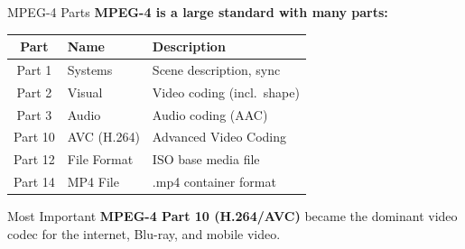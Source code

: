 \documentclass[aspectratio=169,12pt]{beamer}
\begin{document}
\begin{frame}{MPEG-4 Parts}
    \textbf{MPEG-4 is a large standard with many parts:}
    
    \vspace{0.3cm}
    \begin{center}
        \small
        \begin{tabular}{c|l|l}
            \toprule
            \textbf{Part} & \textbf{Name} & \textbf{Description} \\
            \midrule
            Part 1 & Systems & Scene description, sync \\
            Part 2 & Visual & Video coding (incl.\ shape) \\
            Part 3 & Audio & Audio coding (AAC) \\
            Part 10 & AVC (H.264) & Advanced Video Coding \\
            Part 12 & File Format & ISO base media file \\
            Part 14 & MP4 File & .mp4 container format \\
            \bottomrule
        \end{tabular}
    \end{center}
    
    \vspace{0.3cm}
    \begin{alertblock}{Most Important}
        \textbf{MPEG-4 Part 10 (H.264/AVC)} became the dominant video codec for the internet, Blu-ray, and mobile video.
    \end{alertblock}
\end{frame}
\end{document}
